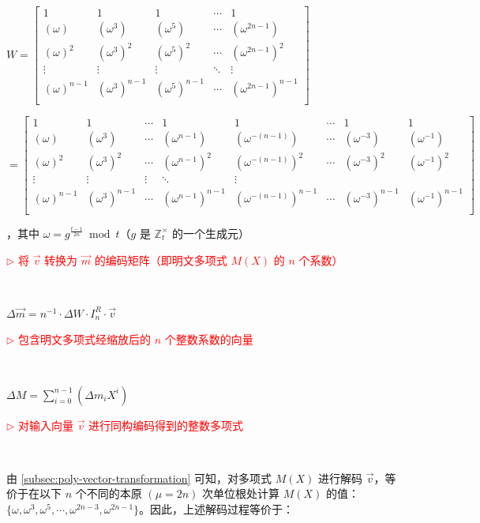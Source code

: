 $ $

$W =  \begin{bmatrix}
1 & 1 & 1 & \cdots & 1\\
(\omega) & (\omega^3) & (\omega^5) & \cdots & (\omega^{2n-1})\\
(\omega)^2 & (\omega^3)^2 & (\omega^5)^2 & \cdots & (\omega^{2n-1})^2\\
\vdots & \vdots & \vdots & \ddots & \vdots \\
(\omega)^{n-1} & (\omega^3)^{n-1} & (\omega^5)^{n-1} & \cdots & (\omega^{2n-1})^{n-1}\\
\end{bmatrix}$

$= \begin{bmatrix}
1 & 1 & \cdots & 1 & 1 & \cdots & 1 & 1\\
(\omega) & (\omega^3) & \cdots & (\omega^{n - 1}) & (\omega^{-(n - 1)}) & \cdots & (\omega^{-3}) & (\omega^{-1})\\
(\omega)^2 & (\omega^3)^2 & \cdots & (\omega^{n - 1})^2 & (\omega^{-(n - 1)})^2 & \cdots & (\omega^{-3})^2 & (\omega^{-1})^2\\
\vdots & \vdots & \vdots & \ddots & \vdots \\
(\omega)^{n-1} & (\omega^3)^{n-1} & \cdots & (\omega^{n - 1})^{n-1} & (\omega^{-(n - 1)})^{n-1} & \cdots & (\omega^{-3})^{n-1} & (\omega^{-1})^{n-1}\\
\end{bmatrix}$

，其中 $\omega = g^{\frac{t - 1}{2n}} \bmod t$（$g$ 是 $\mathbb{Z}_t^{\times}$ 的一个生成元）

\textcolor{red}{ $\rhd$ 将 $\vec{v}$ 转换为 $\vec{m}$ 的编码矩阵（即明文多项式 $M(X)$ 的 $n$ 个系数）}
 


$ $

$\Delta\vec{m}  = n^{-1}\cdot\Delta W\cdot I_n^R\cdot\vec{v}$  

\textcolor{red}{ $\rhd$ 包含明文多项式经缩放后的 $n$ 个整数系数的向量}

$ $

$\Delta M = \sum\limits_{i=0}^{n-1} ( \Delta m_i  X^i)$ 

\textcolor{red}{ $\rhd$ 对输入向量 $\vec{v}$ 进行同构编码得到的整数多项式}


$ $

由 \autoref{subsec:poly-vector-transformation} 可知，对多项式 $M(X)$ 进行解码 $\vec{v}$，等价于在以下 $n$ 个不同的本原 $(\mu=2n)$ 次单位根处计算 $M(X)$ 的值：$\{\omega, \omega^3, \omega^5, \cdots, \omega^{2n-3}, \omega^{2n-1} \}$。因此，上述解码过程等价于：

